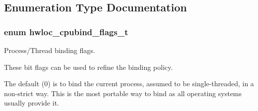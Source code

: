 \subsection{Enumeration Type Documentation}
\hypertarget{a00049_ga217dc8d373f8958cc93c154ebce1c71c}{
\subsubsection[{hwloc\_\-cpubind\_\-flags\_\-t}]{\setlength{\rightskip}{0pt plus 5cm}enum {\bf hwloc\_\-cpubind\_\-flags\_\-t}}}
\label{a00049_ga217dc8d373f8958cc93c154ebce1c71c}


Process/Thread binding flags. 

These bit flags can be used to refine the binding policy.

The default (0) is to bind the current process, assumed to be single-\/threaded, in a non-\/strict way. This is the most portable way to bind as all operating systems usually provide it.


